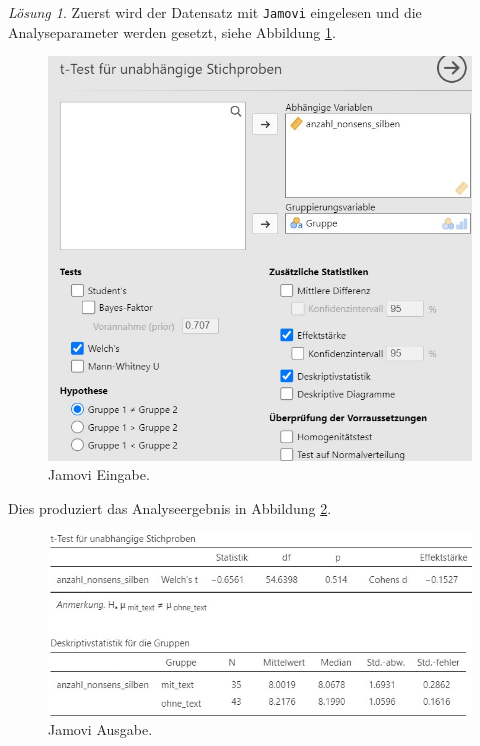 \documentclass[
]{book}
\theoremstyle{definition}
\theoremstyle{definition}
\theoremstyle{definition}
\theoremstyle{definition}
\theoremstyle{remark}
\newtheorem*{solution}{Lösung}
\begin{document}
\begin{solution}

Zuerst wird der Datensatz mit \texttt{Jamovi} eingelesen und die Analyseparameter werden gesetzt, siehe Abbildung \ref{fig:sol-music-memory-input}.

\begin{figure}
\includegraphics[width=1\linewidth]{figures/06-exr-music-memory-jmv-input} \caption{Jamovi Eingabe.}\label{fig:sol-music-memory-input}
\end{figure}

Dies produziert das Analyseergebnis in Abbildung \ref{fig:sol-music-memory-output}.

\begin{figure}
\includegraphics[width=1\linewidth]{figures/06-exr-music-memory-jmv-output} \caption{Jamovi Ausgabe.}\label{fig:sol-music-memory-output}
\end{figure}


\end{solution}
\end{document}
